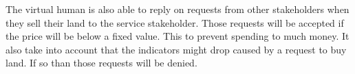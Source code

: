 The virtual human is also able to reply on requests from other stakeholders when they sell their land to the service stakeholder. Those requests will be accepted if the price will be below a fixed value. This to prevent spending to much money. It also take into account that the indicators might drop caused by a request to buy land. If so than those requests will be denied.

